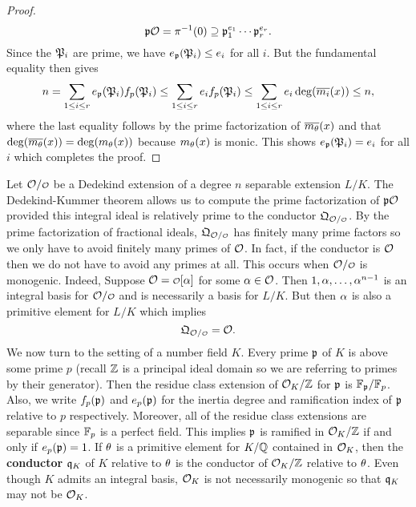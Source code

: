 \begin{proof}
      \[
        \mathfrak{p}\mathcal{O} = \pi^{-1}(0) \supseteq \mathfrak{p}_{1}^{e_{1}} \cdots \mathfrak{p}_{r}^{e_{r}}.
      \]
      Since the $\mathfrak{P}_{i}$ are prime, we have $e_{\mathfrak{p}}(\mathfrak{P}_{i}) \le e_{i}$ for all $i$. But the fundamental equality then gives
      \[
        n = \sum_{1 \le i \le r}e_{\mathfrak{p}}(\mathfrak{P}_{i})f_{p}(\mathfrak{P}_{i}) \le \sum_{1 \le i \le r}e_{i}f_{p}(\mathfrak{P}_{i}) \le \sum_{1 \le i \le r}e_{i}\deg(\overline{m_{i}}(x)) \le n,
      \]
      where the last equality follows by the prime factorization of $\overline{m_{\theta}}(x)$ and that $\deg(\overline{m_{\theta}}(x)) = \deg(m_{\theta}(x))$ because $m_{\theta}(x)$ is monic. This shows $e_{\mathfrak{p}}(\mathfrak{P}_{i}) = e_{i}$ for all $i$ which completes the proof.
    \end{proof}

    Let $\mc{O}/\smc{O}$ be a Dedekind extension of a degree $n$ separable extension $L/K$. The Dedekind-Kummer theorem allows us to compute the prime factorization of $\mathfrak{p}\mathcal{O}$ provided this integral ideal is relatively prime to the conductor $\mf{Q}_{\mc{O}/\smc{O}}$. By the prime factorization of fractional ideals, $\mf{Q}_{\mc{O}/\smc{O}}$ has finitely many prime factors so we only have to avoid finitely many primes of $\mathcal{O}$. In fact, if the conductor is $\mathcal{O}$ then we do not have to avoid any primes at all. This occurs when $\mc{O}/\smc{O}$ is monogenic. Indeed, Suppose $\mc{O} = \smc{O}[\a]$ for some $\alpha \in \mathcal{O}$. Then $1,\alpha,\ldots,\alpha^{n-1}$ is an integral basis for $\mc{O}/\smc{O}$ and is necessarily a basis for $L/K$. But then $\alpha$ is also a primitive element for $L/K$ which implies
    \[
      \mf{Q}_{\mc{O}/\smc{O}} = \mc{O}.
    \]
    We now turn to the setting of a number field $K$. Every prime $\mathfrak{p}$ of $K$ is above some prime $p$ (recall $\mathbb{Z}$ is a principal ideal domain so we are referring to primes by their generator). Then the residue class extension of $\mathcal{O}_{K}/\mathbb{Z}$ for $\mathfrak{p}$ is $\mathbb{F}_{\mathfrak{p}}/\mathbb{F}_{p}$. Also, we write $f_{p}(\mathfrak{p})$ and $e_{p}(\mathfrak{p})$ for the inertia degree and ramification index of $\mathfrak{p}$ relative to $p$ respectively. Moreover, all of the residue class extensions are separable since $\mathbb{F}_{p}$ is a perfect field. This implies $\mathfrak{p}$ is ramified in $\mathcal{O}_{K}/\mathbb{Z}$ if and only if $e_{p}(\mathfrak{p}) = 1$. If $\theta$ is a primitive element for $K/\mathbb{Q}$ contained in $\mathcal{O}_{K}$, then the \textbf{conductor} $\mathfrak{q}_{K}$ of $K$ relative to $\theta$ is the conductor of $\mathcal{O}_{K}/\mathbb{Z}$ relative to $\theta$. Even though $K$ admits an integral basis, $\mathcal{O}_{K}$ is not necessarily monogenic so that $\mathfrak{q}_{K}$ may not be $\mathcal{O}_{K}$.
